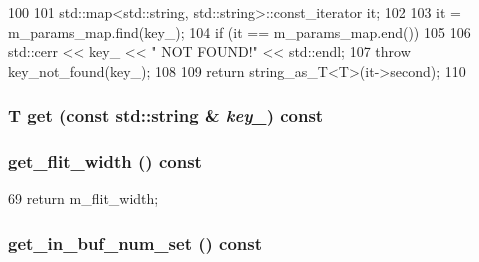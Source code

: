 \begin{DoxyCode}
100 {
101     std::map<std::string, std::string>::const_iterator it;
102 
103     it = m_params_map.find(key_);
104     if (it == m_params_map.end()) 
105     {
106         std::cerr << key_ << " NOT FOUND!" << std::endl;
107         throw key_not_found(key_);
108     }
109     return string_as_T<T>(it->second);
110 }
\end{DoxyCode}
\hypertarget{classOrionConfig_a70ef6f37761d2fc61b9777d5a8b54f2e}{
\subsubsection[{get}]{\setlength{\rightskip}{0pt plus 5cm}T get (const std::string \& {\em key\_\-}) const}}
\label{classOrionConfig_a70ef6f37761d2fc61b9777d5a8b54f2e}
\hypertarget{classOrionConfig_a2a998ef1cdb6f08fd0843144a19adb36}{
\subsubsection[{get\_\-flit\_\-width}]{ get\_\-flit\_\-width () const}}
\label{classOrionConfig_a2a998ef1cdb6f08fd0843144a19adb36}



\begin{DoxyCode}
69 { return m_flit_width; }
\end{DoxyCode}
\hypertarget{classOrionConfig_a83dc3b046850d0938f6eaab4bb6c7ab4}{
\subsubsection[{get\_\-in\_\-buf\_\-num\_\-set}]{ get\_\-in\_\-buf\_\-num\_\-set () const}}
\label{classOrionConfig_a83dc3b046850d0938f6eaab4bb6c7ab4}



